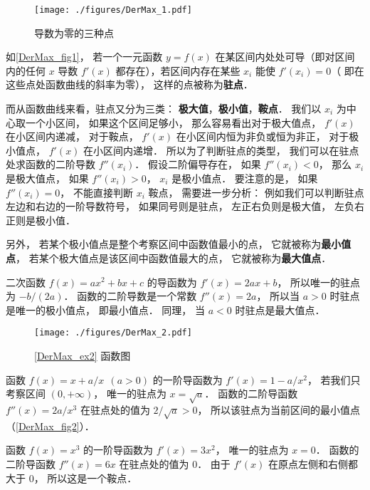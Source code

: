 
\begin{figure}[ht]
\vskip-10pt
\centering
\texttt{[image: ./figures/DerMax\_1.pdf]}
\caption{导数为零的三种点}\label{DerMax_fig1}
\end{figure}

如\autoref{DerMax_fig1}， 若一个一元函数 $y = f(x)$ 在某区间内处处可导（即对区间内的任何 $x$ 导数 $f'(x)$ 都存在），若区间内存在某些 $x_i$ 能使 $f'(x_i) = 0$（ 即在这些点处函数曲线的斜率为零）， 这样的点被称为\textbf{驻点}．

而从函数曲线来看，驻点又分为三类： \textbf{极大值}，\textbf{极小值}，\textbf{鞍点}． 我们以 $x_i$ 为中心取一个小区间， 如果这个区间足够小， 那么容易看出对于极大值点， $f'(x)$ 在小区间内递减， 对于鞍点， $f'(x)$ 在小区间内恒为非负或恒为非正， 对于极小值点， $f'(x)$ 在小区间内递增． 所以为了判断驻点的类型， 我们可以在驻点处求函数的二阶导数 $f''(x_i)$． 假设二阶偏导存在， 如果 $f''(x_i) < 0$， 那么 $x_i$ 是极大值点， 如果 $f''(x_i) > 0$， $x_i$ 是极小值点． 要注意的是， 如果 $f''(x_i) = 0$， 不能直接判断 $x_i$  鞍点， 需要进一步分析： 例如我们可以判断驻点左边和右边的一阶导数符号， 如果同号则是驻点， 左正右负则是极大值， 左负右正则是极小值．

另外， 若某个极小值点是整个考察区间中函数值最小的点， 它就被称为\textbf{最小值点}， 若某个极大值点是该区间中函数值最大的点， 它就被称为\textbf{最大值点}．

\begin{example}{}
二次函数 $f(x) = ax^2 + bx + c$ 的导函数为 $f'(x) = 2ax + b$， 所以唯一的驻点为 $-b/(2a)$． 函数的二阶导数是一个常数 $f''(x) = 2a$， 所以当 $a > 0$ 时驻点是唯一的极小值点， 即最小值点． 同理， 当 $a < 0$ 时驻点是最大值点．
\end{example}

\begin{figure}[ht]
\centering
\texttt{[image: ./figures/DerMax\_2.pdf]}
\caption{\autoref{DerMax_ex2} 函数图} \label{DerMax_fig2}
\end{figure}

\begin{example}{}\label{DerMax_ex2}
函数 $f(x) = x+a/x \ \ (a > 0)$ 的一阶导函数为 $f'(x) = 1 - a/x^2$， 若我们只考察区间 $(0, +\infty)$， 唯一的驻点为 $x = \sqrt{a}$． 函数的二阶导函数 $f''(x) = 2a/x^3$ 在驻点处的值为 $2/\sqrt{a} > 0$， 所以该驻点为当前区间的最小值点（\autoref{DerMax_fig2}）．
\end{example}

\begin{example}{}\label{DerMax_ex3}
函数 $f(x) = x^3$ 的一阶导函数为 $f'(x) = 3x^2$， 唯一的驻点为 $x = 0$． 函数的二阶导函数 $f''(x) = 6x$ 在驻点处的值为 $0$． 由于 $f'(x)$ 在原点左侧和右侧都大于 0， 所以这是一个鞍点．
\end{example}

